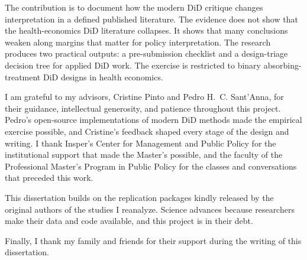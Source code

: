 \documentclass[12pt,oneside]{MastersDoctoralThesis_dry_en}
\begin{document}
\noindent
The contribution is to document how the modern DiD critique changes interpretation in a defined published literature. The evidence does not show that the health-economics DiD literature collapses. It shows that many conclusions weaken along margins that matter for policy interpretation. The research produces two practical outputs: a pre-submission checklist and a design-triage decision tree for applied DiD work. The exercise is restricted to binary absorbing-treatment DiD designs in health economics.

\begin{acknowledgements}
\addchaptertocentry{\acknowledgementname}

I am grateful to my advisors, Cristine Pinto and Pedro H.~C. Sant'Anna, for
their guidance, intellectual generosity, and patience throughout this project.
Pedro's open-source implementations of modern DiD methods made the empirical
exercise possible, and Cristine's feedback shaped every stage of the design and
writing. I thank Insper's Center for Management and Public Policy for the
institutional support that made the Master's possible, and the faculty of the
Professional Master's Program in Public Policy for the classes and conversations
that preceded this work.

This dissertation builds on the replication packages kindly released by the
original authors of the studies I reanalyze. Science advances because
researchers make their data and code available, and this project is in their
debt.

Finally, I thank my family and friends for their support during the writing of
this dissertation.

\end{acknowledgements}


\tableofcontents
\listoffigures
\listoftables

\end{document}

